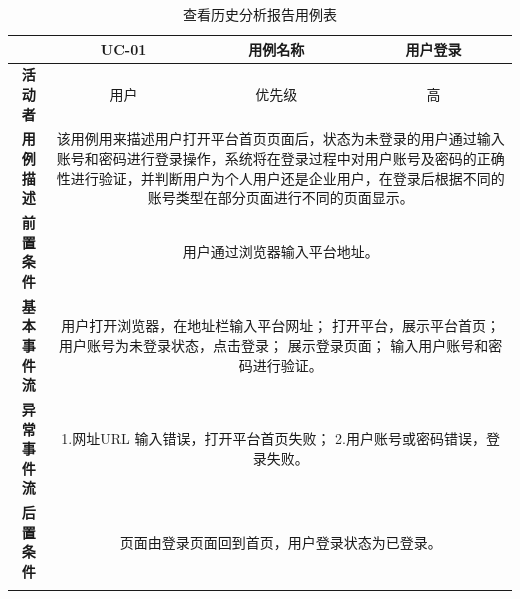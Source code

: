 \begin{longtable}[c]{c|ccc}
	\caption{查看历史分析报告用例表}
	\label{tab:tab9}\\
	\shline
	\multicolumn{1}{c|}{\textbf{用例编号}} & \multicolumn{1}{c|}{UC-01} & \multicolumn{1}{c|}{用例名称} &  用户登录\\ \hline
	\endhead
	\multicolumn{1}{c|}{\textbf{活动者}} & \multicolumn{1}{c|}{用户} & \multicolumn{1}{c|}{优先级} &高  \\ \hline
	\textbf{用例描述} & \multicolumn{3}{p{12cm}}{该用例用来描述用户打开平台首页页面后，状态为未登录的用户通过输入账号和密码进行登录操作，系统将在登录过程中对用户账号及密码的正确性进行验证，并判断用户为个人用户还是企业用户，在登录后根据不同的账号类型在部分页面进行不同的页面显示。} \\ \hline
	\textbf{前置条件}& \multicolumn{3}{p{12cm}}{用户通过浏览器输入平台地址。} \\ \hline
	\textbf{基本事件流}& \multicolumn{3}{p{12cm}}{用户打开浏览器，在地址栏输入平台网址；\newline
		打开平台，展示平台首页；\newline
		用户账号为未登录状态，点击登录；\newline
		展示登录页面；\newline
		输入用户账号和密码进行验证。} \\ \hline
	\textbf{异常事件流}& \multicolumn{3}{p{12cm}}{1.网址URL 输入错误，打开平台首页失败；\newline
		2.用户账号或密码错误，登录失败。
	} \\ \hline
	\textbf{后置条件}& \multicolumn{3}{p{12cm}}{页面由登录页面回到首页，用户登录状态为已登录。} \\ \shline
\end{longtable}

